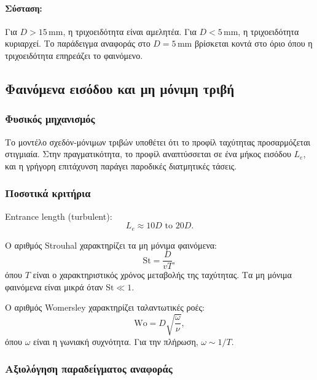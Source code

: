 \documentclass[11pt]{article}
\begin{document}
\paragraph{Σύσταση:} Για $D > 15$\,mm, η τριχοειδότητα είναι αμελητέα. Για $D < 5$\,mm, η τριχοειδότητα κυριαρχεί. Το παράδειγμα αναφοράς στο $D = 5$\,mm βρίσκεται κοντά στο όριο όπου η τριχοειδότητα επηρεάζει το φαινόμενο.

\subsection{Φαινόμενα εισόδου και μη μόνιμη τριβή}

\subsubsection{Φυσικός μηχανισμός}

Το μοντέλο σχεδόν-μόνιμων τριβών υποθέτει ότι το προφίλ ταχύτητας προσαρμόζεται στιγμιαία. Στην πραγματικότητα, το προφίλ αναπτύσσεται σε ένα μήκος εισόδου $L_e$, και η γρήγορη επιτάχυνση παράγει παροδικές διατμητικές τάσεις.

\subsubsection{Ποσοτικά κριτήρια}

Entrance length (turbulent):
\begin{equation}
  L_e \approx 10D \text{ to } 20D.
  \label{eq:entrance}
\end{equation}

Ο αριθμός Strouhal χαρακτηρίζει τα μη μόνιμα φαινόμενα:
\begin{equation}
  \text{St} = \frac{D}{vT},
  \label{eq:strouhal}
\end{equation}
όπου $T$ είναι ο χαρακτηριστικός χρόνος μεταβολής της ταχύτητας. Τα μη μόνιμα φαινόμενα είναι μικρά όταν $\text{St} \ll 1$.

Ο αριθμός Womersley χαρακτηρίζει ταλαντωτικές ροές:
\begin{equation}
  \text{Wo} = D\sqrt{\frac{\omega}{\nu}},
  \label{eq:womersley}
\end{equation}
όπου $\omega$ είναι η γωνιακή συχνότητα. Για την πλήρωση, $\omega \sim 1/T$.

\subsubsection{Αξιολόγηση παραδείγματος αναφοράς}
\end{document}
